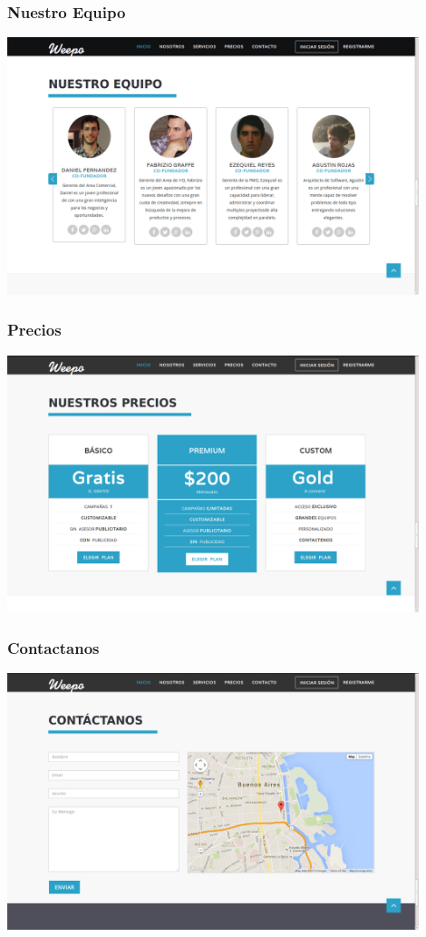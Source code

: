 \documentclass[oneside]{book}
\begin{document}
\subsubsection{Nuestro Equipo}
\medskip

\includegraphics[width=0.9\textwidth]{images/equipo.png}
\bigskip

\subsubsection{Precios}
\medskip
\includegraphics[width=0.9\textwidth]{images/precios.png}
\bigskip

\subsubsection{Contactanos}
\medskip
\includegraphics[width=0.9\textwidth]{images/contacto.png}
\bigskip
\end{document}
